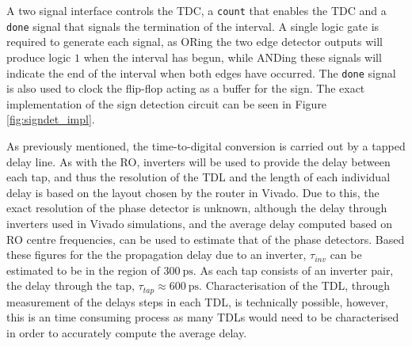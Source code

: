 A two signal interface controls the \ac{TDC}, a \texttt{count} that enables the \ac{TDC} and a \texttt{done} signal that signals the termination of the interval. A single logic gate is required to generate each signal, as ORing the two edge detector outputs will produce logic $1$ when the interval has begun, while ANDing these signals will indicate the end of the interval when both edges have occurred. The \texttt{done} signal is also used to clock the flip-flop acting as a buffer for the sign. The exact implementation of the sign detection circuit can be seen in Figure \ref{fig:signdet_impl}.

As previously mentioned, the time-to-digital conversion is carried out by a tapped delay line. As with the \ac{RO}, inverters will be used to provide the delay between each tap, and thus the resolution of the \ac{TDL} and the length of each individual delay is based on the layout chosen by the router in Vivado. Due to this, the exact resolution of the phase detector is unknown, although the delay through inverters used in Vivado simulations, and the average delay computed based on \ac{RO} centre frequencies, can be used to estimate that of the phase detectors. Based these figures for the the propagation delay due to an inverter, $\tau_{inv}$ can be estimated to be in the region of $300~\si{\pico\second}$. As each tap consists of an inverter pair, the delay through the tap, $\tau_{tap} \approx 600~\si{\pico\second}$. Characterisation of the \ac{TDL}, through measurement of the delays steps in each \ac{TDL}, is technically possible, however, this is an time consuming process as many \acp{TDL} would need to be characterised in order to accurately compute the average delay. 

